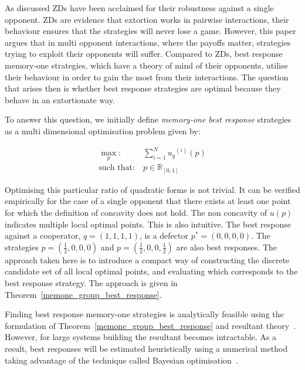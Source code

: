 \documentclass[9pt,twocolumn,twoside,lineno]{pnas-new}
\newcommand{\R}{\mathbb{R}}
\begin{document}
As discussed ZDs have been acclaimed for their robustness
against a single opponent. ZDs are evidence that extortion works
in pairwise interactions, their behaviour ensures that the strategies will never
lose a game. However, this paper argues that in multi opponent interactions,
where the payoffs matter, strategies trying to exploit their opponents will
suffer.
Compared to ZDs, best response memory-one strategies, which have a
theory of mind of their opponents, utilise their behaviour in order to gain the
most from their interactions. The question that arises then is whether best
response strategies are optimal because they behave in an extortionate way.

To answer this question, we initially define \textit{memory-one best response}
strategies as a multi dimensional optimisation problem given by:

\begin{equation}\label{eq:mo_tournament_optimisation}
    \begin{aligned}
    \max_p: & \ \sum_{i=1} ^ {N} {u_q}^{(i)} (p)
    \\
    \text{such that}: & \ p \in \R_{[0, 1]}
    \end{aligned}
\end{equation}

Optimising this particular ratio of quadratic forms is not trivial. It can be
verified empirically for the case of a single opponent that there exists at
least one point for which the definition of concavity does not hold.
The non concavity of \(u(p)\) indicates multiple local
optimal points. This is also intuitive. The best response against a cooperator,
\(q=(1, 1, 1, 1)\), is a defector \(p^*=(0, 0, 0, 0)\). The strategies
\(p=(\frac{1}{2}, 0, 0, 0)\) and \(p=(\frac{1}{2}, 0, 0, \frac{1}{2})\) are also
best responses. The approach taken here is to introduce a compact way of
constructing the discrete candidate set of all local optimal points, and evaluating which
corresponds to the best response strategy. The approach is given in Theorem~\ref{memone_group_best_response}.

Finding best response memory-one strategies is analytically feasible using the
formulation of Theorem~\ref{memone_group_best_response} and resultant
theory~\cite{Jonsson2005}. However, for large systems building the resultant
becomes intractable. As a result, best responses will be estimated
heuristically using a numerical method taking advantage of the technique called
Bayesian optimisation~\cite{Mokus1978}.
\end{document}
